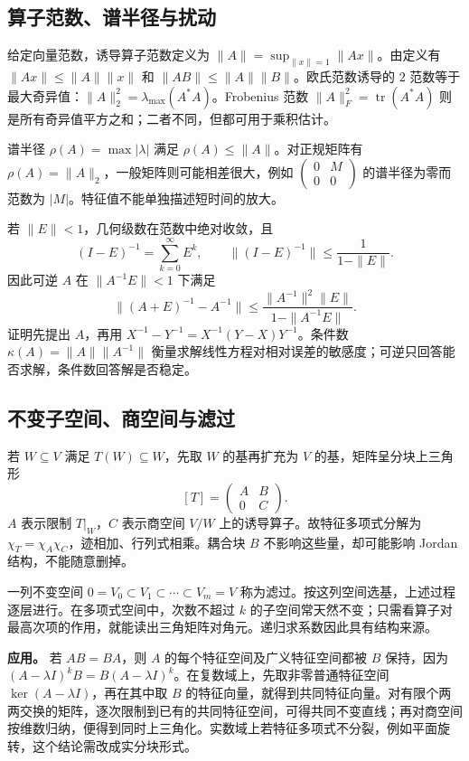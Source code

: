 \documentclass[12pt,fontset=fandol]{ctexart}
\begin{document}
\subsection{算子范数、谱半径与扰动}

\label{app:linear-norm}

给定向量范数，诱导算子范数定义为 $\|A\|=\sup_{\|x\|=1}\|Ax\|$。由定义有 $\|Ax\|\leq\|A\|\|x\|$ 和 $\|AB\|\leq\|A\|\|B\|$。欧氏范数诱导的 $2$ 范数等于最大奇异值：$\|A\|_2^2=\lambda_{\max}(A^*A)$。Frobenius 范数 $\|A\|_F^2=\operatorname{tr}(A^*A)$ 则是所有奇异值平方之和；二者不同，但都可用于乘积估计。

谱半径 $\rho(A)=\max|\lambda|$ 满足 $\rho(A)\leq\|A\|$。对正规矩阵有 $\rho(A)=\|A\|_2$，一般矩阵则可能相差很大，例如 $\begin{pmatrix}0&M\\0&0\end{pmatrix}$ 的谱半径为零而范数为 $|M|$。特征值不能单独描述短时间的放大。

若 $\|E\|<1$，几何级数在范数中绝对收敛，且
\[
(I-E)^{-1}=\sum_{k=0}^\infty E^k,
\qquad\|(I-E)^{-1}\|\leq\frac1{1-\|E\|}.
\]
因此可逆 $A$ 在 $\|A^{-1}E\|<1$ 下满足
\[
\|(A+E)^{-1}-A^{-1}\|
\leq\frac{\|A^{-1}\|^2\|E\|}{1-\|A^{-1}E\|}.
\]
证明先提出 $A$，再用 $X^{-1}-Y^{-1}=X^{-1}(Y-X)Y^{-1}$。条件数 $\kappa(A)=\|A\|\|A^{-1}\|$ 衡量求解线性方程对相对误差的敏感度；可逆只回答能否求解，条件数回答解是否稳定。

\subsection{不变子空间、商空间与滤过}

\label{app:linear-invariant}

若 $W\subseteq V$ 满足 $T(W)\subseteq W$，先取 $W$ 的基再扩充为 $V$ 的基，矩阵呈分块上三角形
\[
[T]=\begin{pmatrix}A&B\\0&C\end{pmatrix}.
\]
$A$ 表示限制 $T|_W$，$C$ 表示商空间 $V/W$ 上的诱导算子。故特征多项式分解为 $\chi_T=\chi_A\chi_C$，迹相加、行列式相乘。耦合块 $B$ 不影响这些量，却可能影响 Jordan 结构，不能随意删掉。

一列不变空间 $0=V_0\subset V_1\subset\cdots\subset V_m=V$ 称为滤过。按这列空间选基，上述过程逐层进行。在多项式空间中，次数不超过 $k$ 的子空间常天然不变；只需看算子对最高次项的作用，就能读出三角矩阵对角元。递归求系数因此具有结构来源。

\textbf{应用。} 若 $AB=BA$，则 $A$ 的每个特征空间及广义特征空间都被 $B$ 保持，因为 $(A-\lambda I)^kB=B(A-\lambda I)^k$。在复数域上，先取非零普通特征空间 $\ker(A-\lambda I)$，再在其中取 $B$ 的特征向量，就得到共同特征向量。对有限个两两交换的矩阵，逐次限制到已有的共同特征空间，可得共同不变直线；再对商空间按维数归纳，便得到同时上三角化。实数域上若特征多项式不分裂，例如平面旋转，这个结论需改成实分块形式。
\end{document}
